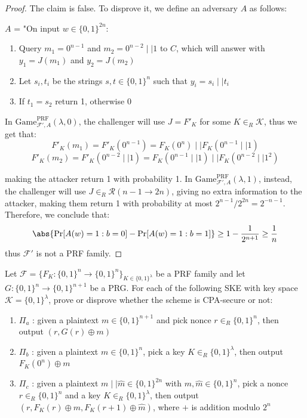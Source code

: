 \documentclass[a4paper, 12pt]{report}
\begin{document}
    \begin{proof}
        The claim is false. To disprove it, we define an adversary $A$ as follows:

        $A$ = "On input $w \in \{0,1\}^{2n}$:
        \begin{enumerate}
            \item Query $m_1 = 0^{n-1}$ and $m_2 = 0^{n-2} \mid\mid 1$ to $C$, which will answer with $y_1 = J(m_1)$ and $y_2 = J(m_2)$
            \item Let $s_i, t_i$ be the strings $s,t \in \{0,1\}^{n}$ such that $y_i = s_i \mid\mid t_i$
            \item If $t_1 = s_2$ return 1, otherwise 0
        \end{enumerate}

        In $\mathrm{Game}_{\mathcal{F'},A}^{\text{PRF}}(\lambda, 0)$, the challenger will use $J = F'_K$ for some $K \in_R \mathcal{K}$, thus we get that:
        \[F'_K(m_1) = F'_K(0^{n-1}) = F_K(0^n) \mid\mid F_K(0^{n-1} \mid\mid 1)\]
        \[F'_K(m_2) = F'_K(0^{n-2} \mid\mid 1) = F_K(0^{n-1} \mid\mid 1) \mid\mid F_K(0^{n-2} \mid\mid 1^2)\]

        making the attacker return 1 with probability 1. In  $\mathrm{Game}_{\mathcal{F'},A}^{\text{PRF}}(\lambda, 1)$, instead, the challenger will use $J \in_R \mathcal{R}(n-1 \to 2n)$, giving no extra information to the attacker, making them return 1 with probability at most $2^{n-1}/2^{2n} = 2^{-n-1}$. Therefore, we conclude that:
        \[\abs{\Pr[A(w) = 1 : b = 0] - \Pr[A(w) = 1 : b = 1]} \geq 1-\frac{1}{2^{n+1}} \geq \frac{1}{n}\]
        thus $\mathcal{F}'$ is not a PRF family.
    \end{proof}

    \begin{framedprob}{}
        Let $\mathcal{F} = \{F_K : \{0,1\}^n \to \{0,1\}^n\}_{K \in \{0,1\}^\lambda}$ be a PRF family and let $G : \{0,1\}^n \to \{0,1\}^{n+1}$ be a PRG. For each of the following SKE with key space $\mathcal{K} = \{0,1\}^\lambda$, prove or disprove whether the scheme is CPA-secure or not:
        \begin{enumerate}[label=\Alph*]
            \item $\Pi_a$ : given a plaintext $m \in \{0,1\}^{n+1}$ and pick nonce $r \in_R \{0,1\}^n$, then output $(r, G(r) \oplus m)$
            \item $\Pi_b$ : given a plaintext $m \in \{0,1\}^{n}$, pick a key $K \in_R \{0,1\}^\lambda$, then output $F_K(0^n) \oplus m$
            \item $\Pi_c$ : given a plaintext $m \mid\mid \widehat m \in \{0,1\}^{2n}$ with $m, \widehat m \in \{0,1\}^n$, pick a nonce $r \in_R \{0,1\}^n$ and a key $K \in_R \{0,1\}^\lambda$, then output $(r, F_K(r) \oplus m, F_K(r+1) \oplus \widehat m)$, where $+$ is addition modulo $2^n$
        \end{enumerate}
    \end{framedprob}
    
\end{document}
